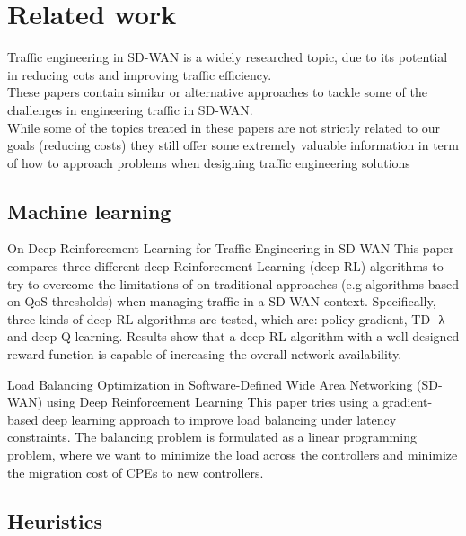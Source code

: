 \section{Related work}

Traffic engineering in SD-WAN is a widely researched topic, due to its potential in reducing cots and improving traffic efficiency. \\
These papers contain similar or alternative approaches to tackle some of the challenges in engineering traffic in SD-WAN. \\
While some of the topics treated in these papers are not strictly related to our goals (reducing costs) they still offer some extremely valuable information in term of how to approach problems when designing traffic engineering solutions

\subsection{Machine learning}

\paperEntry 
{On Deep Reinforcement Learning for Traffic Engineering in SD-WAN \cite{on_deep_reinforcement_learning} }
{This paper compares three different deep Reinforcement Learning (deep-RL) algorithms to try to overcome the limitations of on traditional approaches (e.g algorithms based on QoS thresholds) when managing traffic in a SD-WAN context. Specifically, three kinds of deep-RL algorithms are tested, which are: policy gradient, TD- λ and deep Q-learning. Results show that a deep-RL algorithm with a well-designed reward function is capable of increasing the overall network availability.}

\paperEntry
{Load Balancing Optimization in Software-Defined Wide Area Networking (SD-WAN) using Deep Reinforcement Learning \cite{load_balancing_optimization}}
{This paper tries using a gradient-based deep learning approach to improve load balancing under latency constraints. The balancing problem is formulated as a linear programming problem, where we want to minimize the load across the controllers and minimize the migration cost of CPEs to new controllers.}		   

\subsection{Heuristics}

